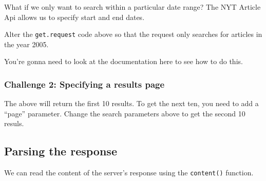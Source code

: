 \documentclass[]{book}
\begin{document}
What if we only want to search within a particular date range? The NYT
Article Api allows us to specify start and end dates.

Alter the \texttt{get.request} code above so that the request only
searches for articles in the year 2005.

You're gonna need to look at the documentation here to see how to do
this.

\subsubsection*{Challenge 2: Specifying a results
page}\label{challenge-2-specifying-a-results-page}

The above will return the first 10 results. To get the next ten, you
need to add a ``page'' parameter. Change the search parameters above to
get the second 10 resuls.

\subsection{Parsing the response}\label{parsing-the-response}

We can read the content of the server's response using the
\texttt{content()} function.
\end{document}
